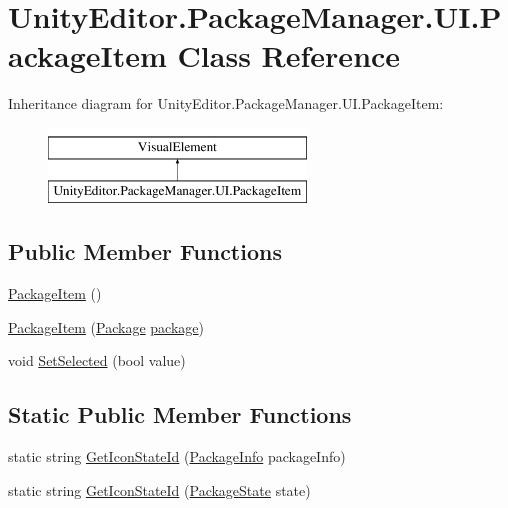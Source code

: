 \hypertarget{class_unity_editor_1_1_package_manager_1_1_u_i_1_1_package_item}{}\section{Unity\+Editor.\+Package\+Manager.\+U\+I.\+Package\+Item Class Reference}
\label{class_unity_editor_1_1_package_manager_1_1_u_i_1_1_package_item}
Inheritance diagram for Unity\+Editor.\+Package\+Manager.\+U\+I.\+Package\+Item\+:\begin{figure}[H]
\begin{center}
\leavevmode
\includegraphics[height=2.000000cm]{class_unity_editor_1_1_package_manager_1_1_u_i_1_1_package_item}
\end{center}
\end{figure}
\subsection*{Public Member Functions}
\begin{DoxyCompactItemize}
\item 
\mbox{\hyperlink{class_unity_editor_1_1_package_manager_1_1_u_i_1_1_package_item_a3baa5052f2cb0a2245b45a18caa9bec8}{Package\+Item}} ()
\item 
\mbox{\hyperlink{class_unity_editor_1_1_package_manager_1_1_u_i_1_1_package_item_ac98665dc507d261f7fae6dced19b7108}{Package\+Item}} (\mbox{\hyperlink{class_unity_editor_1_1_package_manager_1_1_u_i_1_1_package}{Package}} \mbox{\hyperlink{class_unity_editor_1_1_package_manager_1_1_u_i_1_1_package_item_ae1fd38fe3b548b78ce8dd5b24d73d784}{package}})
\item 
void \mbox{\hyperlink{class_unity_editor_1_1_package_manager_1_1_u_i_1_1_package_item_a561285835646beec4fcd677a2a06278b}{Set\+Selected}} (bool value)
\end{DoxyCompactItemize}
\subsection*{Static Public Member Functions}
\begin{DoxyCompactItemize}
\item 
static string \mbox{\hyperlink{class_unity_editor_1_1_package_manager_1_1_u_i_1_1_package_item_a01cfff7330eef99406e9ea78c64dadcd}{Get\+Icon\+State\+Id}} (\mbox{\hyperlink{class_unity_editor_1_1_package_manager_1_1_u_i_1_1_package_info}{Package\+Info}} package\+Info)
\item 
static string \mbox{\hyperlink{class_unity_editor_1_1_package_manager_1_1_u_i_1_1_package_item_a89f95f2169471f85c9a5ad375bdbfa18}{Get\+Icon\+State\+Id}} (\mbox{\hyperlink{namespace_unity_editor_1_1_package_manager_1_1_u_i_ab1815eb3e48074893d9dc1dc99a4a32a}{Package\+State}} state)
\end{DoxyCompactItemize}
